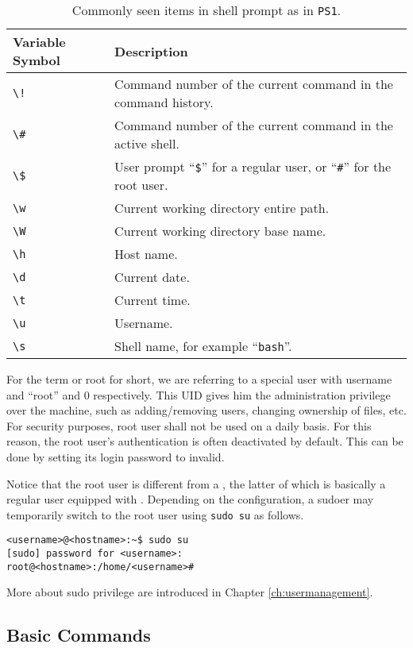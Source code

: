 \begin{table}
	\centering \caption{Commonly seen items in shell prompt as in \texttt{PS1}.}\label{ch:sb:tab:promptvariable}
	\begin{tabularx}{\textwidth}{lX}
		\hline
		Variable Symbol & Description \\ \hline
		\verb|\!| & Command number of the current command in the command history. \\ 
		\verb|\#| & Command number of the current command in the active shell. \\ 
		\verb|\$| & User prompt ``\verb|$|'' for a regular user, or ``\verb|#|'' for the root user. \\
		\verb|\w| & Current working directory entire path. \\ 
		\verb|\W| & Current working directory base name. \\ 
		\verb|\h| & Host name. \\ 
		\verb|\d| & Current date. \\ 
		\verb|\t| & Current time. \\ 
		\verb|\u| & Username. \\ 
		\verb|\s| & Shell name, for example ``\verb|bash|''. \\ 
		\hline
	\end{tabularx}
\end{table}

For the term  or root for short, we are referring to a special user with username and  ``root'' and 0 respectively. This UID gives him the administration privilege over the machine, such as adding/removing users, changing ownership of files, etc. For security purposes, root user shall not be used on a daily basis. For this reason, the root user's authentication is often deactivated by default. This can be done by setting its login password to invalid.

Notice that the root user is different from a , the latter of which is basically a regular user equipped with . Depending on the configuration, a sudoer may temporarily switch to the root user using \verb|sudo su| as follows.
\begin{lstlisting}
<username>@<hostname>:~$ sudo su
[sudo] password for <username>:
root@<hostname>:/home/<username>#
\end{lstlisting}
More about sudo privilege are introduced in Chapter \ref{ch:usermanagement}.

\subsection{Basic Commands}

